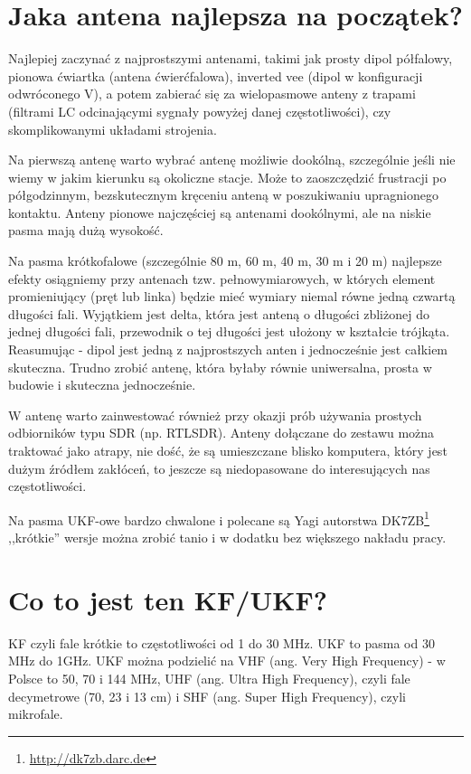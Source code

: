 \documentclass[a4paper,12pt]{article}
\begin{document}
\section{Jaka antena najlepsza na początek?}
Najlepiej zaczynać z najprostszymi antenami, takimi jak prosty dipol półfalowy, pionowa ćwiartka (antena ćwierćfalowa), inverted vee (dipol w konfiguracji odwróconego V), a potem zabierać się za wielopasmowe anteny z trapami (filtrami LC odcinającymi sygnały powyżej danej częstotliwości), czy skomplikowanymi układami strojenia.

Na pierwszą antenę warto wybrać antenę możliwie dookólną, szczególnie jeśli nie wiemy w jakim kierunku są okoliczne stacje. Może to zaoszczędzić frustracji po półgodzinnym, bezskutecznym kręceniu anteną w poszukiwaniu upragnionego kontaktu. Anteny pionowe najczęściej są antenami dookólnymi, ale na niskie pasma mają dużą wysokość.

Na pasma krótkofalowe (szczególnie 80 m, 60 m, 40 m, 30 m i 20 m) najlepsze efekty osiągniemy przy antenach tzw. pełnowymiarowych, w których element promieniujący (pręt lub linka) będzie mieć wymiary niemal równe jedną czwartą długości fali. Wyjątkiem jest delta, która jest anteną o długości zbliżonej do jednej długości fali, przewodnik o tej długości jest ułożony w kształcie trójkąta. Reasumując - dipol jest jedną z najprostszych anten i jednocześnie jest całkiem skuteczna. Trudno zrobić antenę, która byłaby równie uniwersalna, prosta w budowie i skuteczna jednocześnie.

W antenę warto zainwestować również przy okazji prób używania prostych odbiorników typu SDR (np. RTLSDR). Anteny dołączane do zestawu można traktować jako atrapy, nie dość, że są umieszczane blisko komputera, który jest dużym źródłem zakłóceń, to jeszcze są niedopasowane do interesujących nas częstotliwości.

Na pasma UKF-owe bardzo chwalone i polecane są Yagi autorstwa DK7ZB\footnote{\url{http://dk7zb.darc.de}} ,,krótkie'' wersje można zrobić tanio i w dodatku bez większego nakładu pracy.

\section{Co to jest ten KF/UKF?}
KF czyli fale krótkie to częstotliwości od 1 do 30 MHz.
UKF to pasma od 30 MHz do 1GHz. 
UKF można podzielić na VHF (ang. Very High Frequency) - w Polsce to 50, 70 i 144 MHz, UHF (ang. Ultra High Frequency), czyli fale decymetrowe (70, 23 i 13 cm) i SHF (ang. Super High Frequency), czyli mikrofale.
\end{document}
